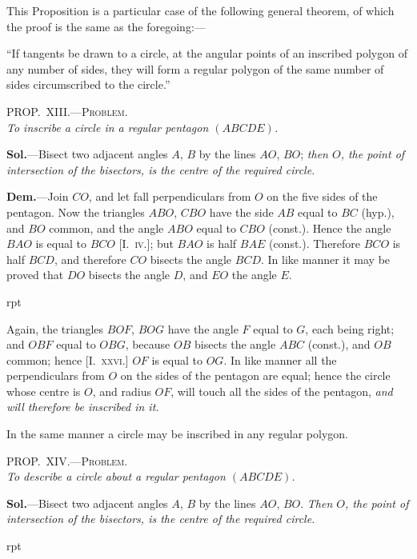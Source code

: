 \documentclass[oneside]{book}
\newcommand\myprop[2]{
\bigskip\Needspace*{4\baselineskip}\begin{center}\textsc{#1}\\\medskip\emph{#2}\par\end{center}
}
\newcommand\imgflow[3]{
\setcounter{wrapwidth}{#1}
\begin{wrapfigure}[#2]{r}{\value{wrapwidth}pt}
\begin{center}
\vspace{-0.3in}
\end{center}
\end{wrapfigure}
}
\begin{document}
\begin{footnotesize}
This Proposition is a particular case of the following general
theorem, of which the proof is the same as the foregoing:---

``If tangents be drawn to a circle, at the angular points of an
inscribed polygon of any number of sides, they will form a regular
polygon of the same number of sides circumscribed to the circle.''
\par\end{footnotesize}

\myprop{PROP\@.~XIII\@.---Problem.}{To inscribe a circle in a regular pentagon $(ABCDE)$.}

\textbf{Sol.}---Bisect two adjacent angles $A$, $B$ by the lines
$AO$, $BO$; \textit{then $O$, the point of intersection of the bisectors,
is the centre of the required circle.}

\textbf{Dem.}---Join $CO$, and let fall perpendiculars from $O$
on the five sides of the pentagon.
Now the triangles
$ABO$, $CBO$ have the side $AB$
equal to $BC$ (hyp.), and $BO$
common, and the angle $ABO$
equal to $CBO$ (const.). Hence
the angle $BAO$ is equal to
$BCO$ [I.~\textsc{iv.}]; but $BAO$ is half
$BAE$ (const.). Therefore $BCO$
is half $BCD$, and therefore $CO$
bisects the angle $BCD$. In
like manner it may be proved that $DO$ bisects the
angle $D$, and $EO$ the angle $E$.


\imgflow{133}{11}{f165}

Again, the triangles $BOF$, $BOG$ have the angle $F$
equal to $G$, each being right; and $OBF$ equal to $OBG$,
because $OB$ bisects the angle $ABC$ (const.), and $OB$
common; hence [\textsc{I.~xxvi.}] $OF$ is equal to $OG$. In like
manner all the perpendiculars from $O$ on the sides of
the pentagon are equal; hence the circle whose centre
is $O$, and radius $OF$, will touch all the sides of the
pentagon, \emph{and will therefore be inscribed in it.}

In the same manner a circle may be inscribed in
any regular polygon.

\myprop{PROP\@.~XIV\@.---Problem.}{To describe a circle about a regular pentagon $(ABCDE)$.}

\textbf{Sol.}---Bisect two adjacent angles $A$, $B$ by the lines
$AO$, $BO$. \emph{Then $O$, the point of intersection of the bisectors,
is the centre of the required circle.}

\imgflow{110}{10}{f166}
\end{document}
